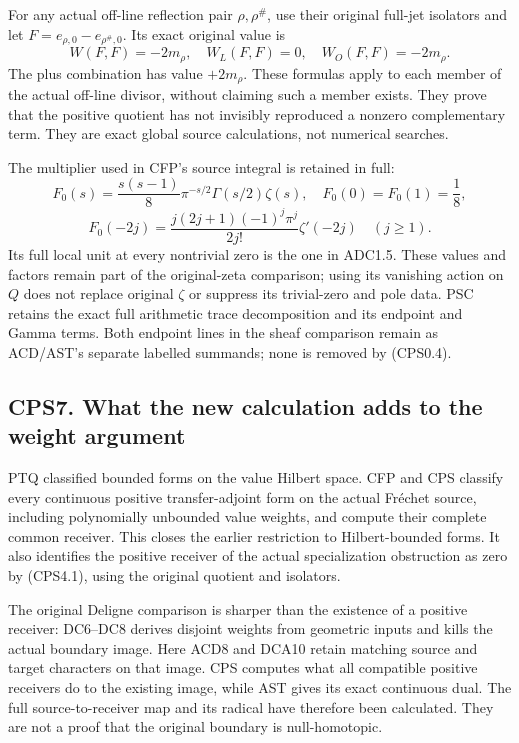For any actual off-line reflection pair \(\rho,\rho^\#\), use their
original full-jet isolators and let \(F=e_{\rho,0}-e_{\rho^\#,0}\). Its
exact original value is \[
W(F,F)=-2m_\rho,
\quad W_L(F,F)=0,
\quad W_O(F,F)=-2m_\rho.
\tag{CPS6.3}
\] The plus combination has value \(+2m_\rho\). These formulas apply to
each member of the actual off-line divisor, without claiming such a
member exists. They prove that the positive quotient has not invisibly
reproduced a nonzero complementary term. They are exact global source
calculations, not numerical searches.

The multiplier used in CFP's source integral is retained in full: \[
F_0(s)=\frac{s(s-1)}8\pi^{-s/2}\Gamma(s/2)\zeta(s),
\quad F_0(0)=F_0(1)=\frac18,
\tag{CPS6.4}
\] \[
F_0(-2j)=\frac{j(2j+1)(-1)^j\pi^j}{2j!}\zeta'(-2j)
\quad(j\ge1).
\tag{CPS6.5}
\] Its full local unit at every nontrivial zero is the one in ADC1.5.
These values and factors remain part of the original-zeta comparison;
using its vanishing action on \(Q\) does not replace original \(\zeta\)
or suppress its trivial-zero and pole data. PSC retains the exact full
arithmetic trace decomposition and its endpoint and Gamma terms. Both
endpoint lines in the sheaf comparison remain as ACD/AST's separate
labelled summands; none is removed by (CPS0.4).

\subsection{CPS7. What the new calculation adds to the weight
argument}\label{cps7.-what-the-new-calculation-adds-to-the-weight-argument}

PTQ classified bounded forms on the value Hilbert space. CFP and CPS
classify every continuous positive transfer-adjoint form on the actual
Fréchet source, including polynomially unbounded value weights, and
compute their complete common receiver. This closes the earlier
restriction to Hilbert-bounded forms. It also identifies the positive
receiver of the actual specialization obstruction as zero by (CPS4.1),
using the original quotient and isolators.

The original Deligne comparison is sharper than the existence of a
positive receiver: DC6--DC8 derives disjoint weights from geometric
inputs and kills the actual boundary image. Here ACD8 and DCA10 retain
matching source and target characters on that image. CPS computes what
all compatible positive receivers do to the existing image, while AST
gives its exact continuous dual. The full source-to-receiver map and its
radical have therefore been calculated. They are not a proof that the
original boundary is null-homotopic.

